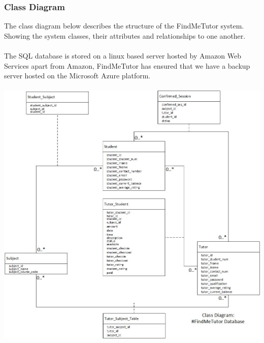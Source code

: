 \documentclass[12pt]{article}
\begin{document}
\subsubsection{Class Diagram}
The class diagram below describes the structure of the FindMeTutor system. Showing the system classes, their attributes and relationships to one another.\\\\
The SQL database is stored on a linux based server hosted by Amazon Web Services apart from Amazon, FindMeTutor has ensured that we have a backup server hosted on the Microsoft Azure platform. 
\\\\
\includegraphics[width=140mm]{./class_diagram/class_diagram_findme_tutor.jpg}
\newpage
\end{document}
